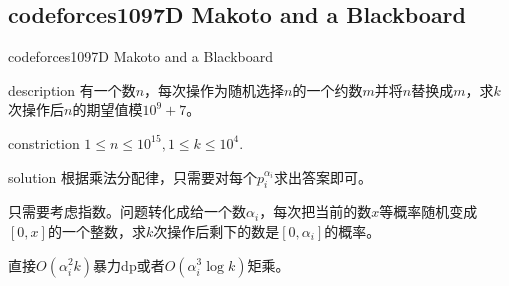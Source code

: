 \documentclass{beamer}
\begin{document}
	\subsection{codeforces1097D Makoto and a Blackboard}
	\begin{frame}{codeforces1097D Makoto and a Blackboard}
		\begin{block}{description}
			有一个数$n$，每次操作为随机选择$n$的一个约数$m$并将$n$替换成$m$，求$k$次操作后$n$的期望值模$10^9+7$。
		\end{block}
		\begin{block}{constriction}
			$1 \le n \le 10^{15}, 1 \le k \le 10^4.$
		\end{block}
		\pause
		\begin{block}{solution}
			根据乘法分配律，只需要对每个$p_i^{\alpha_i}$求出答案即可。
			
			只需要考虑指数。问题转化成给一个数$\alpha_i$，每次把当前的数$x$等概率随机变成$[0,x]$的一个整数，求$k$次操作后剩下的数是$[0,\alpha_i]$的概率。
			
			直接$O(\alpha_i^2k)$暴力dp或者$O(\alpha_i^3\log k)$矩乘。
		\end{block}
	\end{frame}
\end{document}
